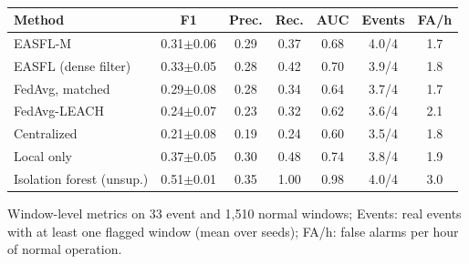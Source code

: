 \documentclass[journal]{IEEEtran}
\newcommand{\pms}[2]{#1{\tiny$\pm$#2}}
\newcommand{\revtab}{\ifdefined\cleanversion\else\color{blue}\fi}
\begin{document}
\begin{table}[t]
\caption{}\label{tab:real}
\centering\scriptsize\setlength{\tabcolsep}{2.4pt}\revtab
\begin{tabular}{@{}lcccccc@{}}
\toprule
Method & F1 & Prec. & Rec. & AUC & Events & FA/h\\
\midrule
EASFL-M & \pms{0.31}{0.06} & 0.29 & 0.37 & 0.68 & 4.0/4 & 1.7\\
EASFL (dense filter) & \pms{0.33}{0.05} & 0.28 & 0.42 & 0.70 & 3.9/4 & 1.8\\
FedAvg, matched & \pms{0.29}{0.08} & 0.28 & 0.34 & 0.64 & 3.7/4 & 1.7\\
FedAvg-LEACH & \pms{0.24}{0.07} & 0.23 & 0.32 & 0.62 & 3.6/4 & 2.1\\
Centralized & \pms{0.21}{0.08} & 0.19 & 0.24 & 0.60 & 3.5/4 & 1.8\\
Local only & \pms{0.37}{0.05} & 0.30 & 0.48 & 0.74 & 3.8/4 & 1.9\\
Isolation forest (unsup.) & \pms{0.51}{0.01} & 0.35 & 1.00 & 0.98 & 4.0/4 & 3.0\\
\bottomrule
\end{tabular}

\vspace{1mm}\parbox{\columnwidth}{\scriptsize Window-level metrics on 33 event and 1{,}510 normal windows; Events: real events with at least one flagged window (mean over seeds); FA/h: false alarms per hour of normal operation.}
\end{table}
\end{document}
